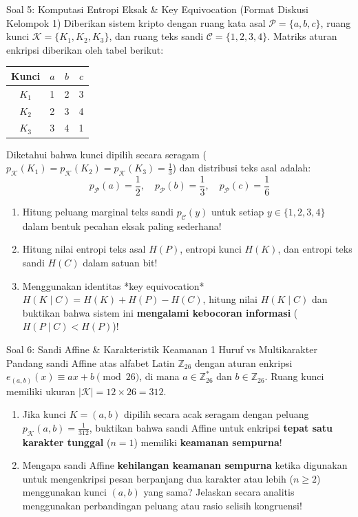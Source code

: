 \documentclass[11pt,a4paper]{article}
\begin{document}
\begin{soalbox}{Soal 5: Komputasi Entropi Eksak \& Key Equivocation (Format Diskusi Kelompok 1)}
Diberikan sistem kripto dengan ruang kata asal $\mathcal{P} = \{a, b, c\}$, ruang kunci $\mathcal{K} = \{K_1, K_2, K_3\}$, dan ruang teks sandi $\mathcal{C} = \{1, 2, 3, 4\}$. Matriks aturan enkripsi diberikan oleh tabel berikut:
\begin{center}
\begin{tabular}{c|ccc}
\toprule
Kunci & $a$ & $b$ & $c$ \\
\midrule
$K_1$ & 1 & 2 & 3 \\
$K_2$ & 2 & 3 & 4 \\
$K_3$ & 3 & 4 & 1 \\
\bottomrule
\end{tabular}
\end{center}
Diketahui bahwa kunci dipilih secara seragam ($p_{\mathcal{K}}(K_1) = p_{\mathcal{K}}(K_2) = p_{\mathcal{K}}(K_3) = \frac{1}{3}$) dan distribusi teks asal adalah:
\[
p_{\mathcal{P}}(a) = \frac{1}{2}, \quad p_{\mathcal{P}}(b) = \frac{1}{3}, \quad p_{\mathcal{P}}(c) = \frac{1}{6}
\]
\begin{enumerate}[label=(\alph*)]
    \item Hitung peluang marginal teks sandi $p_{\mathcal{C}}(y)$ untuk setiap $y \in \{1, 2, 3, 4\}$ dalam bentuk pecahan eksak paling sederhana!
    \item Hitung nilai entropi teks asal $H(P)$, entropi kunci $H(K)$, dan entropi teks sandi $H(C)$ dalam satuan bit!
    \item Menggunakan identitas *key equivocation* $H(K \mid C) = H(K) + H(P) - H(C)$, hitung nilai $H(K \mid C)$ dan buktikan bahwa sistem ini \textbf{mengalami kebocoran informasi} ($H(P \mid C) < H(P)$)!
\end{enumerate}
\end{soalbox}

\vspace{0.4cm}

\begin{soalbox}{Soal 6: Sandi Affine \& Karakteristik Keamanan 1 Huruf vs Multikarakter}
Pandang sandi Affine atas alfabet Latin $\mathbb{Z}_{26}$ dengan aturan enkripsi $e_{(a,b)}(x) \equiv ax + b \pmod{26}$, di mana $a \in \mathbb{Z}_{26}^*$ dan $b \in \mathbb{Z}_{26}$. Ruang kunci memiliki ukuran $|\mathcal{K}| = 12 \times 26 = 312$.
\begin{enumerate}[label=(\alph*)]
    \item Jika kunci $K = (a, b)$ dipilih secara acak seragam dengan peluang $p_{\mathcal{K}}(a, b) = \frac{1}{312}$, buktikan bahwa sandi Affine untuk enkripsi \textbf{tepat satu karakter tunggal} ($n = 1$) memiliki \textbf{keamanan sempurna}!
    \item Mengapa sandi Affine \textbf{kehilangan keamanan sempurna} ketika digunakan untuk mengenkripsi pesan berpanjang dua karakter atau lebih ($n \ge 2$) menggunakan kunci $(a, b)$ yang sama? Jelaskan secara analitis menggunakan perbandingan peluang atau rasio selisih kongruensi!
\end{enumerate}
\end{soalbox}
\end{document}

